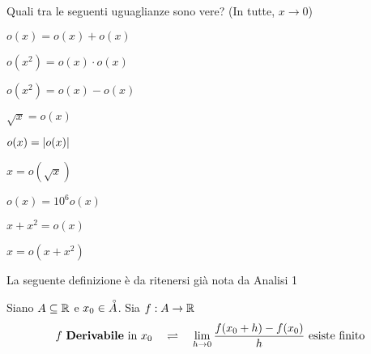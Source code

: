 \begin{exercise}
	Quali tra le seguenti uguaglianze sono vere? (In tutte, $x \to 0$)
	\begin{itemize}
		\begin{minipage}{0.33\linewidth}
			\item $o(x) = o(x) + o(x)$
			\item $o(x^2) = o(x) \cdot o(x)$
			\item $o(x^2) = o(x) - o(x)$
		\end{minipage}
		\begin{minipage}{0.33\linewidth}
			\item $\sqrt{x} = o(x)$
			\item $o(x) = \left|o(x)\right|$
			\item $x = o(\sqrt{x})$
		\end{minipage}
		\begin{minipage}{0.33\linewidth}
			\item $o(x) = 10^6 o(x)$
			\item $x + x^2 = o(x)$
			\item $x = o(x + x^2)$
		\end{minipage}
	\end{itemize}
\end{exercise}
\vspace*{\baselineskip}
La seguente definizione è da ritenersi già nota da Analisi 1
\begin{definition}[Derivata in $\R$]
	Siano $A \subseteq \mathbb{R}$ e $x_0 \in \accentset{\circ}{A}$. Sia $f: A \to \mathbb{R}$
	\[f \text{ \textbf{Derivabile} in } x_0 \quad \rightleftharpoons \quad \lim\limits_{h \to 0} \frac{f(x_0 + h) - f(x_0)}{h} \text{  esiste finito}\]
\end{definition}

